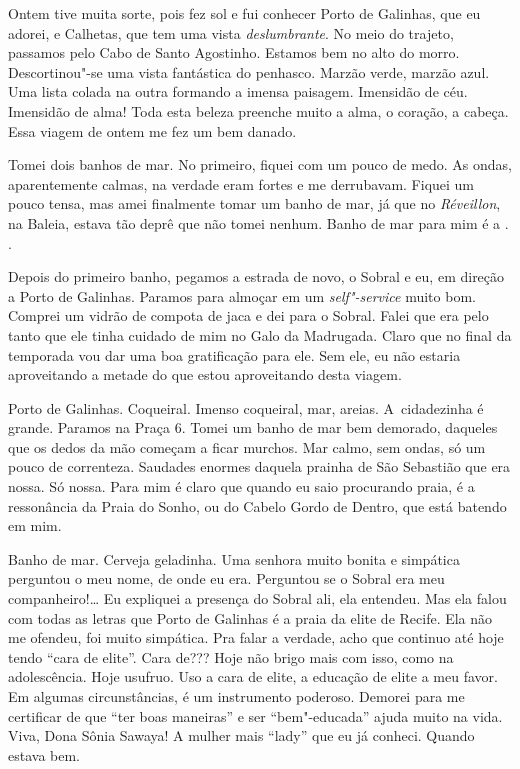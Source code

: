 Ontem tive muita sorte, pois fez sol e fui conhecer Porto de Galinhas,
que eu adorei, e Calhetas, que tem uma vista \emph{deslumbrante}. No
meio do trajeto, passamos pelo Cabo de Santo Agostinho. Estamos bem no
alto do morro. Descortinou"-se uma vista fantástica do penhasco. Marzão
verde, marzão azul. Uma lista colada na outra formando a imensa
paisagem. Imensidão de céu. Imensidão de alma! Toda esta beleza preenche
muito a alma, o coração, a cabeça. Essa viagem de ontem me fez um bem
danado.

Tomei dois banhos de mar. No primeiro, fiquei com um pouco de medo. As
ondas, aparentemente calmas, na verdade eram fortes e me derrubavam.
Fiquei um pouco tensa, mas amei finalmente tomar um banho de mar, já que
no \emph{Réveillon}, na Baleia, estava tão deprê que não tomei nenhum.
Banho de mar para mim é a . .

Depois do primeiro banho, pegamos a estrada de novo, o Sobral e eu, em
direção a Porto de Galinhas. Paramos para almoçar em um
\emph{self"-service} muito bom. Comprei um vidrão de compota de jaca e
dei para o Sobral. Falei que era pelo tanto que ele tinha cuidado de mim
no Galo da Madrugada. Claro que no final da temporada vou dar uma boa
gratificação para ele. Sem ele, eu não estaria aproveitando a metade do
que estou aproveitando desta viagem.

Porto de Galinhas. Coqueiral. Imenso coqueiral, mar, areias. A~cidadezinha é grande. Paramos na Praça 6. Tomei um banho de mar bem
demorado, daqueles que os dedos da mão começam a ficar murchos. Mar
calmo, sem ondas, só um pouco de correnteza. Saudades enormes daquela
prainha de São Sebastião que era nossa. Só nossa. Para mim é claro que
quando eu saio procurando praia, é a ressonância da Praia do Sonho, ou
do Cabelo Gordo de Dentro, que está batendo em mim.

Banho de mar. Cerveja geladinha. Uma senhora muito bonita e simpática
perguntou o meu nome, de onde eu era. Perguntou se o Sobral era meu
companheiro!… Eu expliquei a presença do Sobral ali, ela
entendeu. Mas ela falou com todas as letras que Porto de Galinhas é a
praia da elite de Recife. Ela não me ofendeu, foi muito simpática. Pra
falar a verdade, acho que continuo até hoje tendo ``cara de elite''.
Cara de??? Hoje não brigo mais com isso, como na adolescência. Hoje
usufruo. Uso a cara de elite, a educação de elite a meu favor. Em
algumas circunstâncias, é um instrumento poderoso. Demorei para me
certificar de que ``ter boas maneiras'' e ser ``bem"-educada'' ajuda
muito na vida. Viva, Dona Sônia Sawaya! A mulher mais ``lady'' que eu já
conheci. Quando estava bem.

